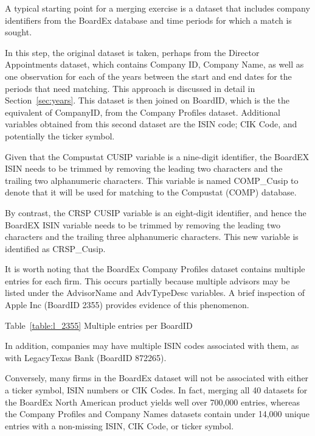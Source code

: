 \documentclass[12pt]{article}
\begin{document}
A typical starting point for a merging exercise is a dataset that includes company identifiers from the BoardEx database and time periods for which a match is sought.

In this step, the original dataset is taken, perhaps from the Director Appointments dataset, which contains Company ID, Company Name, as well as one observation for each of the years between the start and end dates for the periods that need matching.
This approach is discussed in detail in Section~\ref{sec:years}.
This dataset is then joined on BoardID, which is the the equivalent of CompanyID, from the Company Profiles dataset.
Additional variables obtained from this second dataset are the ISIN code; CIK Code, and potentially the ticker symbol.

Given that the Compustat CUSIP variable is a nine-digit identifier, the BoardEX ISIN needs to be trimmed by removing the leading two characters and the trailing two alphanumeric characters.
This variable is named COMP\_Cusip to denote that it will be used for matching to the Compustat (COMP) database.

By contrast, the CRSP CUSIP variable is an eight-digit identifier, and hence the BoardEX ISIN variable needs to be trimmed by removing the leading two characters and the trailing three alphanumeric characters.
This new variable is identified as CRSP\_Cusip.

It is worth noting that the BoardEx Company Profiles dataset contains multiple entries for each firm.
This occurs partially because multiple advisors may be listed under the AdvisorName and AdvTypeDesc variables.
A brief inspection of Apple Inc (BoardID 2355) provides evidence of this phenomenon.

\begin{center}
Table~\ref{table:l_2355} Multiple entries per BoardID\label{table:l_2355}

\end{center}

In addition, companies may have multiple ISIN codes associated with them, as with LegacyTexas Bank (BoardID 872265).

\begin{center}

\end{center}

Conversely, many firms in the BoardEx dataset will not be associated with either a ticker symbol, ISIN numbers or CIK Codes.
In fact, merging all 40 datasets for the BoardEx North American product yields well over 700,000 entries, whereas the Company Profiles and Company Names datasets contain under 14,000 unique entries with a non-missing ISIN, CIK Code, or ticker symbol.
\end{document}

